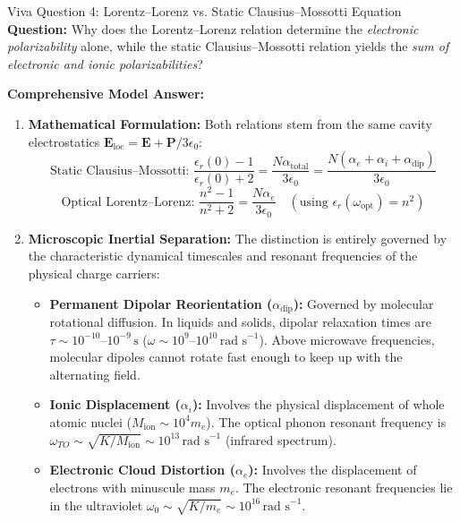 \documentclass[11pt,a4paper]{article}
\begin{document}
\vspace{0.4cm}

\begin{checkpointbox}{Viva Question 4: Lorentz--Lorenz vs. Static Clausius--Mossotti Equation}
\textbf{Question:} Why does the Lorentz--Lorenz relation determine the \emph{electronic polarizability} alone, while the static Clausius--Mossotti relation yields the \emph{sum of electronic and ionic polarizabilities}?

\textbf{Comprehensive Model Answer:}
\begin{enumerate}[leftmargin=*]
    \item \textbf{Mathematical Formulation:}
    Both relations stem from the same cavity electrostatics $\mathbf{E}_{\text{loc}} = \mathbf{E} + \mathbf{P}/3\epsilon_0$:
    \begin{equation*}
        \text{Static Clausius--Mossotti: } \frac{\epsilon_r(0) - 1}{\epsilon_r(0) + 2} = \frac{N\alpha_{\text{total}}}{3\epsilon_0} = \frac{N(\alpha_e + \alpha_i + \alpha_{\text{dip}})}{3\epsilon_0}
    \end{equation*}
    \begin{equation*}
        \text{Optical Lorentz--Lorenz: } \frac{n^2 - 1}{n^2 + 2} = \frac{N\alpha_e}{3\epsilon_0} \quad (\text{using } \epsilon_r(\omega_{\text{opt}}) = n^2)
    \end{equation*}
    \item \textbf{Microscopic Inertial Separation:}
    The distinction is entirely governed by the characteristic dynamical timescales and resonant frequencies of the physical charge carriers:
    \begin{itemize}
        \item \textbf{Permanent Dipolar Reorientation ($\alpha_{\text{dip}}$):} Governed by molecular rotational diffusion. In liquids and solids, dipolar relaxation times are $\tau \sim 10^{-10}$--$10^{-9}\,\text{s}$ ($\omega \sim 10^{9}$--$10^{10}\,\text{rad s}^{-1}$). Above microwave frequencies, molecular dipoles cannot rotate fast enough to keep up with the alternating field.
        \item \textbf{Ionic Displacement ($\alpha_i$):} Involves the physical displacement of whole atomic nuclei ($M_{\text{ion}} \sim 10^4 m_e$). The optical phonon resonant frequency is $\omega_{TO} \sim \sqrt{K/M_{\text{ion}}} \sim 10^{13}\,\text{rad s}^{-1}$ (infrared spectrum).
        \item \textbf{Electronic Cloud Distortion ($\alpha_e$):} Involves the displacement of electrons with minuscule mass $m_e$. The electronic resonant frequencies lie in the ultraviolet $\omega_0 \sim \sqrt{K/m_e} \sim 10^{16}\,\text{rad s}^{-1}$.

\end{itemize}
\end{enumerate}
\end{checkpointbox}
\end{document}
